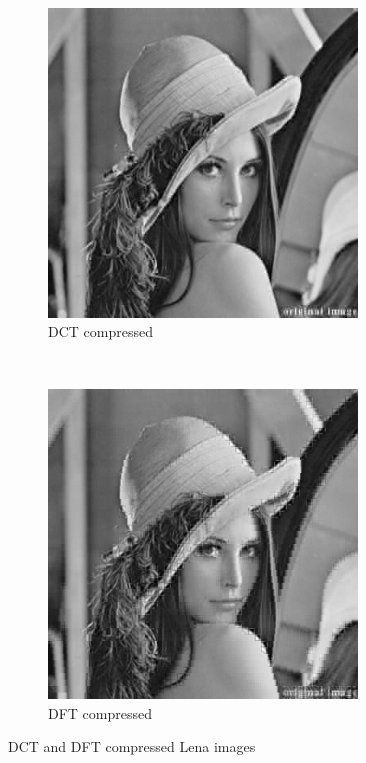 \begin{figure}[H]
	\centering
	\begin{subfigure}[t]{0.5\textwidth}
		\centering
		\includegraphics[width=0.9\textwidth]{compress-dct}
		\caption{DCT compressed}
	\end{subfigure}%
	~
	\begin{subfigure}[t]{0.5\textwidth}
		\centering
		\includegraphics[width=0.9\textwidth]{compress-dft}
		\caption{DFT compressed}
	\end{subfigure}%
	\caption{DCT and DFT compressed Lena images}
	\label{fig:compress}
\end{figure}

